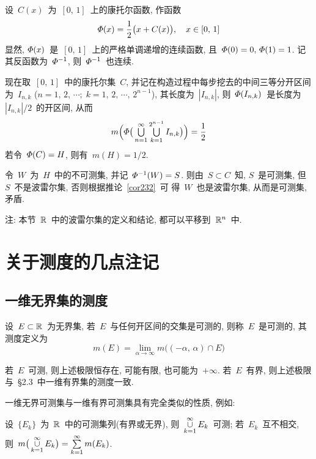 \medskip

\begin{example}[非波雷尔集的可测集]
设~$C(x)$~为~$[0,\,1]$~上的康托尔函数, 作函数
\[
\mathnormal{\Phi}(x)=\frac{1}{2}\big( x + C(x) \big), \quad  x \in [0,\,1]
\]
显然, $\mathnormal{\Phi}(x)$~是~$[0,\,1]$~上的严格单调递增的连续函数,
且~$\mathnormal{\Phi}(0)=0,\,\mathnormal{\Phi}(1)=1$. 记其反函数为~$\mathnormal{\Phi}^{-1}$, 则~$\mathnormal{\Phi}^{-1}$~也连续.

现在取~$[0,\,1]$~中的康托尔集~$C$, 并记在构造过程中每步挖去的中间三等分开区间为~$I_{n,k}$
($n=1,\,2,\,\cdots;\;k=1,\,2,\,\cdots,\,2^{n-1}$), 其长度为~$|I_{n,k}|$, 则~$\mathnormal{\Phi}(I_{n,k})$~是长度为~$|I_{n,k}|/2$~的开区间, 从而
\[
m \Big(\mathnormal{\Phi}\big( \mathop{\textstyle{\bigcup}}_{n=1}^\infty \mathop{\textstyle{\bigcup}}_{k=1}^{2^{n-1}} I_{n,k} \big) \Big) = \frac{1}{2}
\]
若令~$\mathnormal{\Phi}(C)=H$, 则有~$m(H)=1/2$.

令~$W$~为~$H$~中的不可测集, 并记~$\mathnormal{\Phi}^{-1}(W)=S$. 则由~$S \subset C$~知, $S$~是可测集, 但~$S$~不是波雷尔集, 否则根据推论~\ref{cor232}~可
得~$W$~也是波雷尔集, 从而是可测集, 矛盾.
\end{example}

\medskip

注: 本节~$\mathbb{R}$~中的波雷尔集的定义和结论, 都可以平移到~$\mathbb{R}^n$~中.

\section{关于测度的几点注记}

\subsection{一维无界集的测度}

\begin{definition}
设~$E \subset \mathbb{R}$~为无界集, 若~$E$~与任何开区间的交集是可测的,
则称~$E$~是可测的, 其测度定义为
\[
m(E) = \lim_{\alpha \to \infty} m\big( (-\alpha,\,\alpha) \cap E\big)
\]
\end{definition}

\begin{remark}
若~$E$~可测, 则上述极限恒存在, 可能有限, 也可能为~$+\infty$. 若~$E$~有界, 则上述极限
与~\S2.3~中一维有界集的测度一致.
\end{remark}

一维无界可测集与一维有界可测集具有完全类似的性质, 例如:

\begin{proposition}
设~$\{E_k\}$~为~$\mathbb{R}$~中的可测集列(有界或无界), 则~$\mathop{\cup}\limits_{k=1}
^\infty E_k$~可测; 若~$E_k$~互不相交, 则~$m\big( \mathop{\cup}\limits_{k=1}^\infty E_k\big) =
\sum\limits_{k=1}^\infty m(E_k)$.
\end{proposition}

